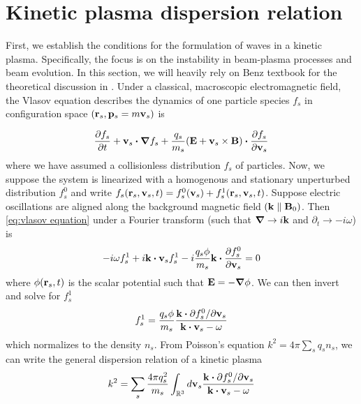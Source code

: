 \section{Kinetic plasma dispersion relation}\label{sec:dispersion relation}

First, we establish the conditions for the formulation of waves in a kinetic
plasma. Specifically, the focus is on the instability in beam-plasma processes
and beam evolution. In this section, we will heavily rely on Benz textbook for
the theoretical discussion in \cite{Benz1993}. Under a classical, macroscopic
electromagnetic field, the Vlasov equation describes the dynamics of one
particle species $f_s$ in configuration space $(\vb{r}_s,\vb{p}_s=m\vb{v}_s)$ is

\begin{equation}\label{eq:vlasov equation}
    \frac{\partial f_s}{\partial t}
    +\vb{v}_s\vdot\grad{f_s}
    +\frac{q_s}{m_s}\qty(\vb{E}+\vb{v}_s\times\vb{B})
    \vdot\frac{\partial f_s}{\partial\vb{v}_s}
\end{equation}
where we have assumed a collisionless distribution $f_s$ of particles. Now, we
suppose the system is linearized with a homogenous and stationary unperturbed
distribution $f_s^0$ and write
$f_s\qty(\vb{r}_s,\vb{v}_s,t)
=f_s^0\qty(\vb{v}_s)+f_s^1\qty(\vb{r}_s,\vb{v}_s,t)$.
Suppose electric oscillations are aligned along the background magnetic field
$(\vb{k}\parallel\vb{B}_0)$. Then \cref{eq:vlasov equation} under a Fourier
transform (such that $\grad\to i\vb{k}$ and $\partial_t\to-i\omega$) is
\begin{equation}
    -i\omega f_s^1
    +i\vb{k}\vdot\vb{v}_sf_s^1
    -i\frac{q_s\phi}{m_s}\vb{k}\vdot\frac{\partial f_s^0}{\partial\vb{v}_s}=0
\end{equation}
where $\phi(\vb{r}_s,t)$ is the scalar potential such that $\vb{E}=-\grad\phi$.
We can then invert and solve for $f_s^1$
\begin{equation}\label{eq:distribution perturbation}
    f_s^1
    =\frac{q_s\phi}{m_s}
    \frac{\vb{k}\vdot\partial f_s^0/\partial\vb{v}_s}
    {\vb{k}\vdot\vb{v}_s-\omega}
\end{equation}
which normalizes to the density $n_s$. From Poisson's equation
$k^2=4\pi\sum_sq_sn_s$, we can write the general dispersion relation of a
kinetic plasma
\begin{equation}\label{eq:general dispersion relation}
    k^2=\sum_s\frac{4\pi q_s^2}{m_s}
    \int_{\R^3}d\vb{v}_s\frac{\vb{k}\vdot\partial f_s^0/\partial\vb{v}_s}
        {\vb{k}\vdot\vb{v}_s-\omega}
\end{equation}

